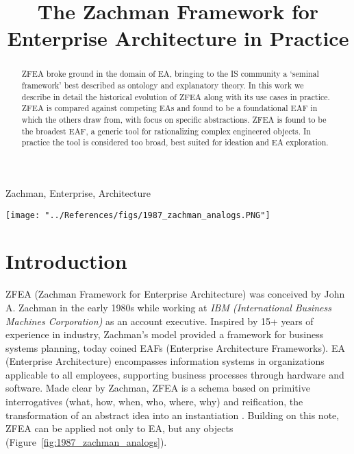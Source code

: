 \documentclass[12pt,conference]{IEEEtran}
\begin{document}
\title{The Zachman Framework for Enterprise Architecture in Practice \\}

\author{
}

\maketitle

\begin{abstract}
ZFEA broke ground in the domain of EA, bringing to the IS community a `seminal framework' best described as ontology and explanatory theory. 
In this work we describe in detail the historical evolution of ZFEA along with its use cases in practice. 
ZFEA is compared against competing EAs and found to be a foundational EAF in which the others draw from, with focus on specific abstractions. 
ZFEA is found to be the broadest EAF, a generic tool for rationalizing complex engineered objects. 
In practice the tool is considered too broad, best suited for ideation and EA exploration.
\end{abstract}

\begin{IEEEkeywords}
Zachman, Enterprise, Architecture 
\end{IEEEkeywords}

\begin{figure*}[htbp]
    \centerline{\texttt{[image: "../References/figs/1987\_zachman\_analogs.PNG"]}}
    \caption{1987 Analog Representations from Core Views/Perspectives \cite{zachman_ibm_1987}.}
    \label{fig:1987_zachman_analogs}
\end{figure*}

\section{Introduction}
ZFEA (Zachman Framework for Enterprise Architecture) was conceived by John A. Zachman in the early 1980s while working at \emph{IBM (International Business Machines Corporation)} as an account executive. 
Inspired by 15+ years of experience in industry, Zachman's model provided a framework for business systems planning, today coined EAFs (Enterprise Architecture Frameworks).
EA (Enterprise Architecture) encompasses information systems in organizations applicable to all employees, supporting business processes through hardware and software. 
Made clear by Zachman, ZFEA is a schema based on primitive interrogatives (what, how, when, who, where, why) and reification, the transformation of an abstract idea into an instantiation \cite{about_the_zachman_framework}.
Building on this note, ZFEA can be applied not only to EA, but any objects (Figure~\ref{fig:1987_zachman_analogs}).
\end{document}
